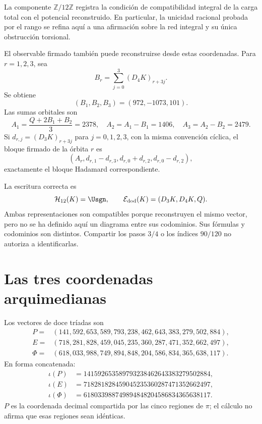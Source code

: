 La componente \(\mathbb Z/12\mathbb Z\) registra la condición de
compatibilidad integral de la carga total con el potencial reconstruido.
En particular, la unicidad racional probada por el rango se refina aquí a
una afirmación sobre la red integral y su única obstrucción torsional.

El observable firmado también puede reconstruirse desde estas coordenadas.
Para \(r=1,2,3\), sea
\[
B_r=\sum_{j=0}^{3}(D_4K)_{r+3j}.
\]
Se obtiene
\[
(B_1,B_2,B_3)=(972,-1073,101).
\]
Las sumas orbitales son
\[
A_1=\frac{Q+2B_1+B_2}{3}=2378,
\quad
A_2=A_1-B_1=1406,
\quad
A_3=A_2-B_2=2479.
\]
Si
\(d_{r,j}=(D_3K)_{r+3j}\) para \(j=0,1,2,3\), con la misma convención
cíclica, el bloque firmado de la órbita \(r\) es
\[
(A_r,d_{r,1}-d_{r,3},d_{r,0}+d_{r,2},d_{r,0}-d_{r,2}),
\]
exactamente el bloque Hadamard correspondiente.

\begin{remark}
La escritura correcta es
\[
\mathcal H_{12}(K)=\Usgn,
\qquad
\mathcal E_{\mathrm{dod}}(K)=(D_3K,D_4K,Q).
\]
Ambas representaciones son compatibles porque reconstruyen el mismo vector,
pero no se ha definido aquí un diagrama entre sus codominios. Sus fórmulas y
codominios son distintos. Compartir los pasos \(3/4\) o los índices \(90/120\) no
autoriza a identificarlas.
\end{remark}

\section{Las tres coordenadas arquimedianas}

Los vectores de doce tríadas son
\[
\begin{aligned}
P={}&(141,592,653,589,793,238,462,643,383,279,502,884),\\
E={}&(718,281,828,459,045,235,360,287,471,352,662,497),\\
\Phi={}&(618,033,988,749,894,848,204,586,834,365,638,117).
\end{aligned}
\]
En forma concatenada:
\[
\begin{aligned}
\iota(P)&=141592653589793238462643383279502884,\\
\iota(E)&=718281828459045235360287471352662497,\\
\iota(\Phi)&=618033988749894848204586834365638117.
\end{aligned}
\]
\(P\) es la coordenada decimal compartida por las cinco regiones de
\(\pi\); el cálculo no afirma que esas regiones sean idénticas.

